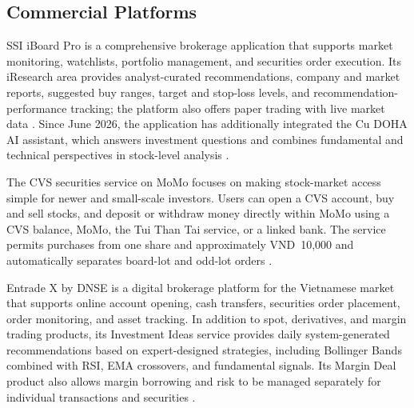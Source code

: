 \subsection{Commercial Platforms}

SSI iBoard Pro is a comprehensive brokerage application that supports market monitoring, watchlists, portfolio management, and securities order execution. Its iResearch area provides analyst-curated recommendations, company and market reports, suggested buy ranges, target and stop-loss levels, and recommendation-performance tracking; the platform also offers paper trading with live market data \cite{ssiIboardResearch2026,ssiIboardLaunch2023}. Since June 2026, the application has additionally integrated the Cu DOHA AI assistant, which answers investment questions and combines fundamental and technical perspectives in stock-level analysis \cite{ssiCuDoha2026}.

The CVS securities service on MoMo focuses on making stock-market access simple for newer and small-scale investors. Users can open a CVS account, buy and sell stocks, and deposit or withdraw money directly within MoMo using a CVS balance, MoMo, the Tui Than Tai service, or a linked bank. The service permits purchases from one share and approximately VND~10,000 and automatically separates board-lot and odd-lot orders \cite{momoCVSSecurities2026}.

Entrade X by DNSE is a digital brokerage platform for the Vietnamese market that supports online account opening, cash transfers, securities order placement, order monitoring, and asset tracking. In addition to spot, derivatives, and margin trading products, its Investment Ideas service provides daily system-generated recommendations based on expert-designed strategies, including Bollinger Bands combined with RSI, EMA crossovers, and fundamental signals. Its Margin Deal product also allows margin borrowing and risk to be managed separately for individual transactions and securities \cite{dnseEntradeGuide2026,dnseInvestmentIdeas2026,dnseMarginDeal2026}.

